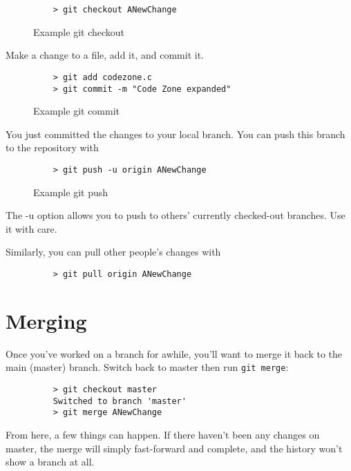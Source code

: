 \documentclass[11pt]{report}
\begin{document}
\begin{figure}[H]
  \caption{Example git checkout}
  \begin{lstlisting}
    > git checkout ANewChange
  \end{lstlisting}
\end{figure}

Make a change to a file, add it, and commit it.

\begin{figure}[H]
  \caption{Example git commit}
  \begin{lstlisting}
    > git add codezone.c
    > git commit -m "Code Zone expanded"
    \end{lstlisting}
\end{figure}

You just committed the changes to your local branch.  You can push
this branch to the repository with

\begin{figure}[H]
  \caption{Example git push}
  \begin{lstlisting}
    > git push -u origin ANewChange
  \end{lstlisting}
\end{figure}

The -u option allows you to push to others' currently checked-out
branches. Use it with care.

Similarly, you can pull other people's changes with

\begin{figure}[H]
  \begin{lstlisting}
    > git pull origin ANewChange
  \end{lstlisting}
\end{figure}

\section{Merging}

Once you've worked on a branch for awhile, you'll want to merge it
back to the main (master) branch. Switch back to master then run
\texttt{git merge}:

\begin{figure}[H]
  \begin{lstlisting}
    > git checkout master
    Switched to branch 'master'
    > git merge ANewChange
  \end{lstlisting}
\end{figure}

From here, a few things can happen. If there haven't been any changes
on master, the merge will simply fast-forward and complete, and the
history won't show a branch at all.
\end{document}
